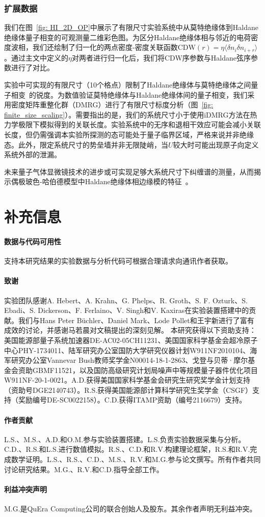 \documentclass[preprint,superscriptaddress,floatfix, nofootinbib]{revtex4-2}
\begin{document}
\subsubsection*{扩展数据}
我们在图~\ref{fig: HI_2D_OP}中展示了有限尺寸实验系统中从莫特绝缘体到Haldane绝缘体量子相变的可观测量二维彩色图。为区分Haldane绝缘体相与邻近的电荷密度波相，我们还绘制了归一化的两点密度-密度关联函数$\mathrm{CDW}(r)=\eta\langle \delta n_i \delta n_{i+r} \rangle$。通过主文中定义的$\eta$对两者进行归一化后，我们将CDW序参数与Haldane弦序参数进行了对比。

实验中可实现的有限尺寸（10个格点）限制了Haldane绝缘体与莫特绝缘体之间量子相变~\cite{Fraxanet2022}的锐度。为数值验证莫特绝缘体与Haldane绝缘体间的量子相变，我们采用密度矩阵重整化群（DMRG）进行了有限尺寸标度分析（图~\ref{fig: finite_size_scaling}）。需要指出的是，我们的系统尺寸小于使用iDMRG方法在热力学极限下模拟得到的关联长度。实验系统中的无序和退相干效应可能会减小关联长度，但仍需强调本实验所探测的态可能处于量子临界区域，严格来说并非绝缘态。此外，限定系统尺寸的势垒墙并非无限陡峭，当$U$较大时可能出现原子向定义系统外部的泄漏。

未来量子气体显微镜技术的进步或可实现足够大系统尺寸下纠缠谱的测量，从而揭示偶极玻色-哈伯德模型中Haldane绝缘体相边缘模的特征~\cite{Deng2011, Tran2023}。
\section*{补充信息}

\paragraph*{数据与代码可用性}
支持本研究结果的实验数据与分析代码可根据合理请求向通讯作者获取。

\paragraph*{致谢}
实验团队感谢A. Hebert、A. Krahn、G. Phelps、R. Groth、S. F. Ozturk、S. Ebadi、S. Dickerson、F. Ferlaino、V. Singh和V. Kaxiras在实验装置搭建中的贡献。我们与Hans Peter B\"uchler、Daniel Mark、Lode Pollet和王宇新进行了富有成效的讨论，并感谢马若晨对文稿提出的深刻见解。
本研究获得以下资助支持：美国能源部量子系统加速器DE-AC02-05CH11231、美国国家科学基金会超冷原子中心PHY-1734011、陆军研究办公室国防大学研究仪器计划W911NF2010104、海军研究办公室Vannevar Bush教师奖学金N00014-18-1-2863、戈登与贝蒂·摩尔基金会资助GBMF11521，以及国防高级研究计划局噪声中等规模量子器件优化项目W911NF-20-1-0021。A.D.获得美国国家科学基金会研究生研究奖学金计划支持（资助号DGE2140743）。R.S.获得美国能源部计算科学研究生奖学金（CSGF）支持（奖励编号DE-SC0022158）。C.D.获得ITAMP资助（编号2116679）支持。

\paragraph*{作者贡献}
L.S.、M.S.、A.D.和O.M.参与实验装置搭建。L.S.负责实验数据采集与分析。C.D.、R.S.和L.S.进行数值模拟。R.S.、C.D.和R.V.构建理论框架，R.S.和R.V.完成数学证明。L.S.、R.S.、C.D.、M.S.、R.V.和M.G.参与论文撰写。所有作者共同讨论研究结果。M.G.、R.V.和C.D.指导全部工作。

\paragraph*{利益冲突声明}
M.G.是QuEra Computing公司的联合创始人及股东。其余作者声明无利益冲突。

\nocite{*}


\end{document}
